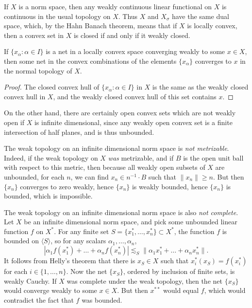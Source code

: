 If $X$ is a norm space, then any weakly continuous linear functional on $X$ is continuous in the usual topology on $X$. Thus $X$ and $X_\sigma$ have the same dual space, which, by the Hahn Banach theorem, means that if $X$ is locally convex, then a convex set in $X$ is closed if and only if it weakly closed. 

\begin{theorem}
    If $\{ x_\alpha : \alpha \in I \}$ is a net in a locally convex space converging weakly to some $x \in X$, then some net in the convex combinations of the elements $\{ x_\alpha \}$ converges to $x$ in the normal topology of $X$.
\end{theorem}
\begin{proof}
    The closed convex hull of $\{ x_\alpha : \alpha \in I \}$ in $X$ is the same as the weakly closed convex hull in $X$, and the weakly closed convex hull of this set contains $x$.
\end{proof}

On the other hand, there are certainly open convex sets which are not weakly open if $X$ is infinite dimensional, since any weakly open convex set is a finite intersection of half planes, and is thus unbounded.

The weak topology on an infinite dimensional norm space is \emph{not metrizable}. Indeed, if the weak topology on $X$ \emph{was} metrizable, and if $B$ is the open unit ball with respect to this metric, then because all weakly open subsets of $X$ are unbounded, for each $n$, we can find $x_n \in n^{-1} \cdot B$ such that $\| x_n \| \geq n$. But then $\{ x_n \}$ converges to zero weakly, hence $\{ x_n \}$ is weakly bounded, hence $\{ x_n \}$ is bounded, which is impossible.

The weak topology on an infinite dimensional norm space is also \emph{not complete}. Let $X$ be an infinite dimensional norm space, and pick some unbounded linear function $f$ on $X^*$. For any finite set $S = \{ x_1^*, \dots, x_n^* \} \subset X^*$, the function $f$ is bounded on $\langle S \rangle$, so for any scalars $\alpha_1,\dots,\alpha_n$,
%
\[ |\alpha_1 f(x_1^*) + \dots + \alpha_n f(x_n^*)| \lesssim_S \| \alpha_1 x_1^* + \dots + \alpha_n x_n^* \|. \]
%
It follows from Helly's theorem that there is $x_S \in X$ such that $x_i^*(x_S) = f(x_i^*)$ for each $i \in \{ 1, \dots, n \}$. Now the net $\{ x_S \}$, ordered by inclusion of finite sets, is weakly Cauchy. If $X$ was complete under the weak topology, then the net $\{ x_S \}$ would converge weakly to some $x \in X$. But then $x^{**}$ would equal $f$, which would contradict the fact that $f$ was bounded.

